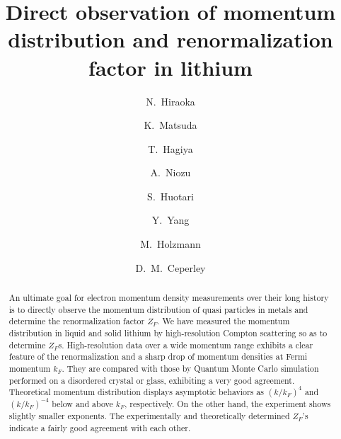 \documentclass[twocolumn,showpacs,showkeys,fleqn,prl,superscriptaddress]{revtex4}%
\begin{document}

\title{
Direct observation of momentum distribution and renormalization factor in lithium
}

\author{ 
N.~Hiraoka
}

\author{ 
K.~Matsuda
}

\author{ 
T.~Hagiya
}
  
\author{ 
A.~Niozu
}


\author{ 
S.~Huotari
}

\author{ 
Y.~Yang
}

\author{ 
M.~Holzmann
}

\author{ 
D.~M.~Ceperley
}







\date{}
\begin{abstract}

An ultimate goal for electron momentum density measurements over their long history is to directly observe the momentum distribution of quasi particles in metals and determine the renormalization factor $Z_F$.
We have measured the momentum distribution in liquid and solid lithium by high-resolution Compton scattering so as to determine $Z_F$s.
High-resolution data over a wide momentum range exhibits a clear feature of the renormalization and a sharp drop of momentum densities at Fermi momentum $k_F$.
They are compared with those by Quantum Monte Carlo simulation performed on a disordered crystal or glass, exhibiting a very good agreement.        
Theoretical momentum distribution displays asymptotic behaviors as $(k/k_F)^4$ and $(k/k_F)^{-4}$ below and above $k_F$, respectively.
On the other hand, the experiment shows slightly smaller exponents. 
The experimentally and theoretically determined $Z_F$’s indicate a fairly good agreement with each other.


\end{abstract}
\maketitle
\end{document}
